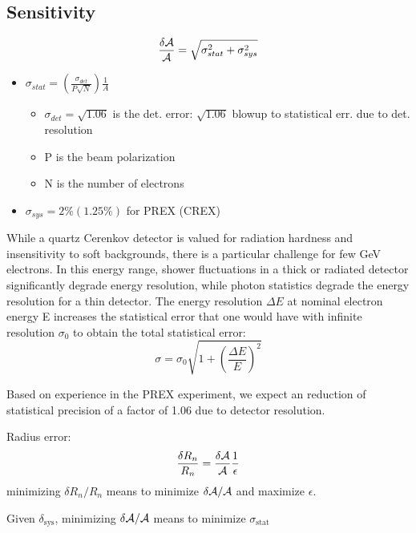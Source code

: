 \subsection{Sensitivity}
\begin{equation*}
    \frac{\delta\mathcal{A}}{\mathcal{A}} = \sqrt{\sigma_{stat}^2 + \sigma_{sys}^2}
\end{equation*}
\begin{itemize}
    \item $\sigma_{stat} = \left(\frac{\sigma_{det}}{P\sqrt{N}}\right) \frac{1}{A}$
	\begin{itemize}
	    \item $\sigma_{det} = \sqrt{1.06}$ is the det. error: $\sqrt{1.06}$ blowup to statistical err. due to det. resolution
	    \item P is the beam polarization
	    \item N is the number of electrons
	\end{itemize}
    \item $\sigma_{sys} = 2\% (1.25\%)$ for PREX (CREX)
\end{itemize}

    While a quartz Cerenkov detector is valued for radiation hardness and insensitivity to soft backgrounds, there is a particular challenge for few GeV electrons. In this energy range, shower fluctuations in a thick or radiated detector significantly degrade energy resolution, while photon statistics degrade the energy resolution for a thin detector. The energy resolution $\Delta E$ at nominal electron energy E increases the statistical error that one would have with infinite resolution $\sigma_0$ to obtain the total statistical error:
$$ \sigma = \sigma_0\sqrt{1+\left(\frac{\Delta E}{E}\right)^2}$$
    
Based on experience in the PREX experiment, we expect an reduction of statistical precision of a factor of 1.06 due to detector resolution.

\bigskip
Radius error:
\begin{equation*}
    \frac{\delta R_n}{R_n} = \frac{\delta \mathcal{A}}{\mathcal{A}}\frac{1}{\epsilon}
\end{equation*}
minimizing $\delta R_n/R_n$ means to minimize $\delta \mathcal{A}/\mathcal{A}$ and maximize $\epsilon$. 

Given $\delta_{\text{sys}}$, minimizing $\delta\mathcal{A}/\mathcal{A}$ means to minimize $\sigma_{\text{stat}}$

